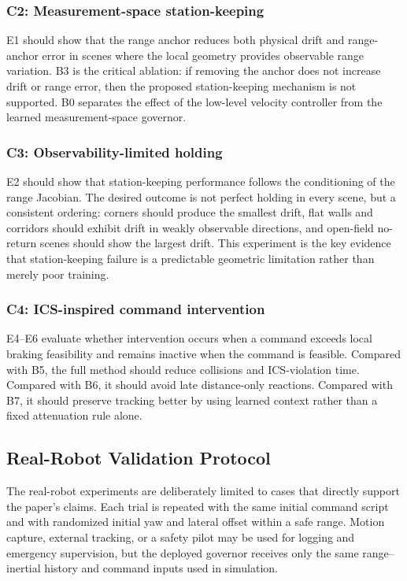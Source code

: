 \documentclass[11pt]{article}
\begin{document}
\subsubsection{C2: Measurement-space station-keeping}
E1 should show that the range anchor reduces both physical drift and range-anchor
error in scenes where the local geometry provides observable range variation.
B3 is the critical ablation: if removing the anchor does not increase drift or
range error, then the proposed station-keeping mechanism is not supported.  B0
separates the effect of the low-level velocity controller from the learned
measurement-space governor.

\subsubsection{C3: Observability-limited holding}
E2 should show that station-keeping performance follows the conditioning of the
range Jacobian.  The desired outcome is not perfect holding in every scene, but
a consistent ordering: corners should produce the smallest drift, flat walls and
corridors should exhibit drift in weakly observable directions, and open-field
no-return scenes should show the largest drift.  This experiment is the key
evidence that station-keeping failure is a predictable geometric limitation
rather than merely poor training.

\subsubsection{C4: ICS-inspired command intervention}
E4--E6 evaluate whether intervention occurs when a command exceeds local
braking feasibility and remains inactive when the command is feasible.  Compared
with B5, the full method should reduce collisions and ICS-violation time.
Compared with B6, it should avoid late distance-only reactions.  Compared with
B7, it should preserve tracking better by using learned context rather than a
fixed attenuation rule alone.

\subsection{Real-Robot Validation Protocol}
\label{sec:exp_real_robot}

The real-robot experiments are deliberately limited to cases that directly
support the paper's claims.  Each trial is repeated with the same initial
command script and with randomized initial yaw and lateral offset within a safe
range.  Motion capture, external tracking, or a safety pilot may be used for
logging and emergency supervision, but the deployed governor receives only the
same range--inertial history and command inputs used in simulation.
\end{document}
